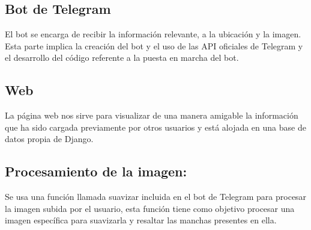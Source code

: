 \subsection{Bot de Telegram}
El bot se encarga de recibir la información relevante, a la ubicación y la imagen. Esta parte implica la creación del bot y el uso de las API oficiales de Telegram y el desarrollo del código referente a la puesta en marcha del bot.
\subsection{Web}
La página web nos sirve para visualizar de una manera amigable la información que ha sido cargada previamente por otros usuarios y está alojada en una base de datos propia de Django.
\subsection{Procesamiento de la imagen:}
Se usa una función llamada suavizar incluida en el bot de Telegram para procesar la imagen subida por el usuario, esta función tiene como objetivo procesar una imagen específica para suavizarla y resaltar las manchas presentes en ella.
